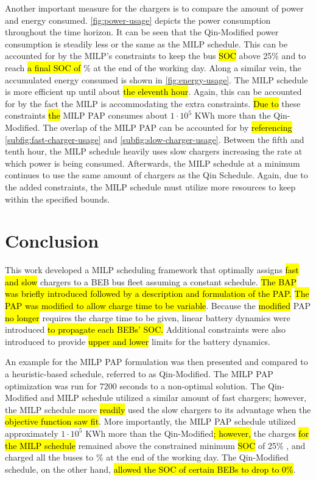 \documentclass[utf8]{FrontiersinHarvard}
\newcommand{\bcharge}{0.7 }                                                     %
\newcommand{\mincharge}{25\% }                                                  %
\newcommand{\timeran}{7200 }                                                    %
\begin{document}
Another important measure for the chargers is to compare the amount of power and energy consumed.
\autoref{fig:power-usage} depicts the power consumption throughout the time horizon. It can be seen that the
Qin-Modified power consumption is steadily less or the same as the MILP schedule. This can be accounted for by the
MILP's constraints to keep the bus \hl{SOC} above \mincharge and to reach \hl{a final SOC of}
\fpeval{\bcharge *100}\% at the end of the working day. Along a similar vein, the accumulated energy consumed is shown in
\autoref{fig:energy-usage}. The MILP schedule is more efficient up until about \hl{the eleventh hour}. Again,
this can be accounted for by the fact the MILP is accommodating the extra constraints. \hl{Due to} these
constraints \hl{the} MILP PAP consumes about \(1\cdot10^5\) KWh more than the Qin-Modified. The overlap of the MILP
PAP can be accounted for by \hl{referencing} \autoref{subfig:fast-charger-usage} and
\autoref{subfig:slow-charger-usage}. Between the fifth and tenth hour, the MILP schedule heavily uses slow chargers
increasing the rate at which power is being consumed. Afterwards, the MILP schedule at a minimum continues to use the
same amount of chargers as the Qin Schedule. Again, due to the added constraints, the MILP schedule must utilize more
resources to keep within the specified bounds.
\section{Conclusion}
\label{sec:conclusion}
This work developed a MILP scheduling framework that optimally assigns \hl{fast and slow} chargers to a BEB
bus fleet assuming a constant schedule. \hl{The BAP was briefly introduced followed by a description and formulation of the PAP.} \hl{The PAP was modified to allow charge time to be variable}. Because the
\hl{modified} PAP \hl{no longer} requires the charge time to be given, linear battery dynamics
were introduced \hl{to propagate each BEBs' SOC.} Additional constraints were also introduced to provide
\hl{upper and lower} limits for the battery dynamics.

An example for the MILP PAP formulation was then presented and compared to a heuristic-based schedule, referred to as
Qin-Modified. The MILP PAP optimization was run for \timeran seconds to a non-optimal solution. The Qin-Modified and
MILP schedule utilized a similar amount of fast chargers; however, the MILP schedule more \hl{readily} used
the slow chargers to its advantage when the \hl{objective function saw fit}. More importantly, the MILP PAP
schedule utilized approximately \(1\cdot10^5\) KWh more than the Qin-Modified\hl{; however,} the charges \hl{for the MILP schedule} remained above the constrained minimum \hl{SOC} of \mincharge, and charged all the buses to
\fpeval{\bcharge *100}\% at the end of the working day. The Qin-Modified schedule, on the other hand,
\hl{allowed the SOC of certain BEBs to drop to 0\%}.
\end{document}
